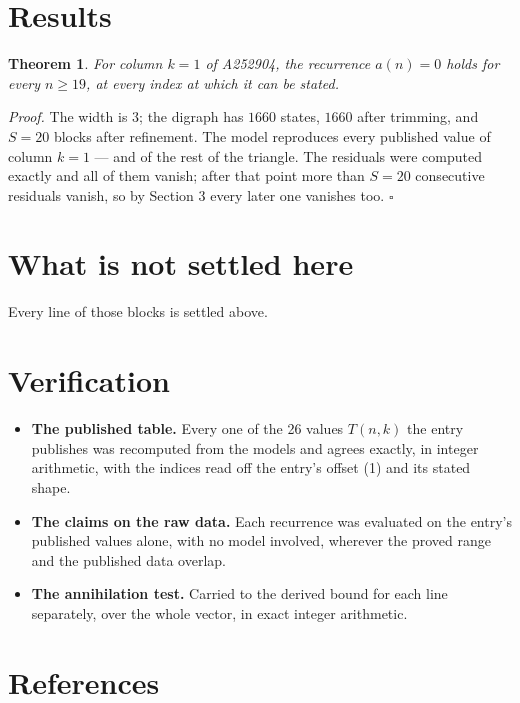 \documentclass[11pt]{article}
\newtheorem{theorem}{Theorem}
\theoremstyle{definition}
\begin{document}
\section{Results}

\begin{theorem} For column $k = 1$ of A252904, the recurrence $a(n) = 0$ holds for every $n \ge 19$, at every index at which it can be stated.\end{theorem}

{\itshape Proof.} The width is $3$; the digraph has $1660$ states, $1660$ after trimming, and $S = 20$ blocks after refinement. The model reproduces every published value of column $k = 1$ --- and of the rest of the triangle. The residuals were computed exactly and all of them vanish; after that point more than $S = 20$ consecutive residuals vanish, so by Section 3 every later one vanishes too. $\square$

\section{What is not settled here}

Every line of those blocks is settled above.

\section{Verification}

\begin{itemize}

\item {\bfseries The published table.} Every one of the 26 values $T(n,k)$ the entry publishes was recomputed from the models and agrees exactly, in integer arithmetic, with the indices read off the entry's offset (1) and its stated shape.

\item {\bfseries The claims on the raw data.} Each recurrence was evaluated on the entry's published values alone, with no model involved, wherever the proved range and the published data overlap.

\item {\bfseries The annihilation test.} Carried to the derived bound for each line separately, over the whole vector, in exact integer arithmetic.

\end{itemize}

\section{References}
\end{document}
